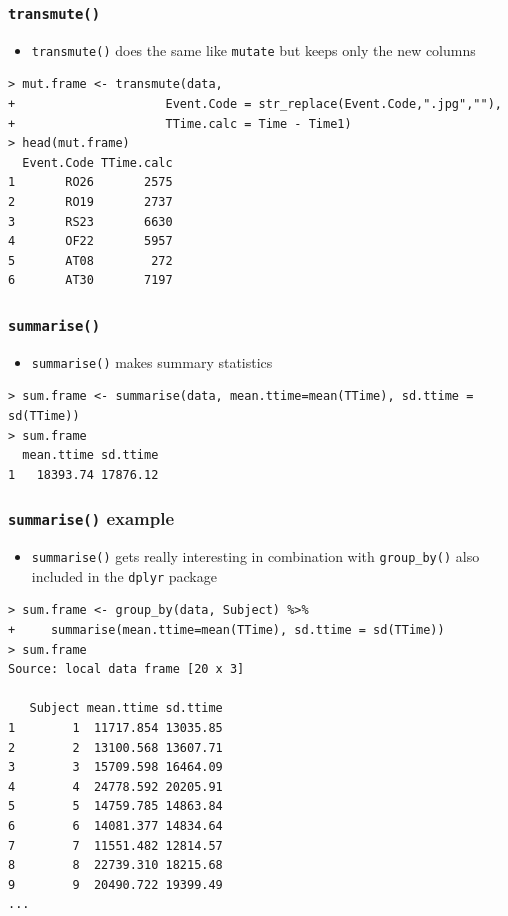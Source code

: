 \documentclass[xcolor={table},c]{beamer}
\begin{document}
\begin{frame}[fragile]\frametitle{\texttt{transmute()}}
  \begin{itemize}
  \item \texttt{transmute()} does the same like \texttt{mutate{}} but keeps only the new columns
  \end{itemize}\footnotesize
\begin{verbatim}
> mut.frame <- transmute(data,
+                     Event.Code = str_replace(Event.Code,".jpg",""),
+                     TTime.calc = Time - Time1)
> head(mut.frame)
  Event.Code TTime.calc
1       RO26       2575
2       RO19       2737
3       RS23       6630
4       OF22       5957
5       AT08        272
6       AT30       7197
\end{verbatim}
\end{frame}

\begin{frame}[fragile]\frametitle{\texttt{summarise()}}
  \begin{itemize}
  \item \texttt{summarise()} makes summary statistics
  \end{itemize}
\begin{verbatim}
> sum.frame <- summarise(data, mean.ttime=mean(TTime), sd.ttime = sd(TTime))
> sum.frame
  mean.ttime sd.ttime
1   18393.74 17876.12  
\end{verbatim}
\end{frame}


\begin{frame}[fragile]\frametitle{\texttt{summarise()} example}
  \begin{itemize}
  \item \texttt{summarise()} gets really interesting in combination with \texttt{group\_by()} also included in the \texttt{dplyr} package
  \end{itemize}\footnotesize
\begin{verbatim}
> sum.frame <- group_by(data, Subject) %>%
+     summarise(mean.ttime=mean(TTime), sd.ttime = sd(TTime))
> sum.frame
Source: local data frame [20 x 3]

   Subject mean.ttime sd.ttime
1        1  11717.854 13035.85
2        2  13100.568 13607.71
3        3  15709.598 16464.09
4        4  24778.592 20205.91
5        5  14759.785 14863.84
6        6  14081.377 14834.64
7        7  11551.482 12814.57
8        8  22739.310 18215.68
9        9  20490.722 19399.49
...
\end{verbatim}
\end{frame}
\end{document}
